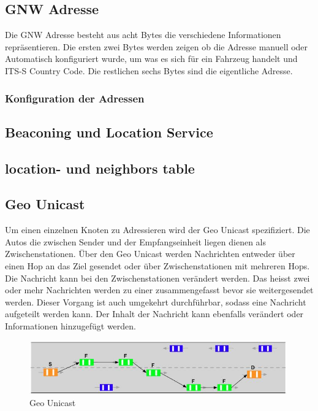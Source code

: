 \subsection{\acl{GNW} Adresse}
Die \acl{GNW} Adresse besteht aus acht Bytes die verschiedene Informationen repräsentieren. Die ersten zwei Bytes werden zeigen ob die Adresse manuell oder Automatisch konfiguriert wurde, um was es sich für ein Fahrzeug handelt und ITS-S Country Code. Die restlichen sechs Bytes sind die eigentliche Adresse.
\subsubsection{Konfiguration der Adressen}
\subsection{Beaconing und Location Service}

\subsection{location- und neighbors table}


\subsection{Geo Unicast}
Um einen einzelnen Knoten zu Adressieren wird der Geo Unicast spezifiziert. Die Autos die zwischen Sender und der Empfangseinheit liegen dienen als Zwischenstationen. Über den Geo Unicast werden Nachrichten entweder über einen Hop an das Ziel gesendet oder über Zwischenstationen mit mehreren Hops. Die Nachricht kann bei den Zwischenstationen verändert werden. Das heisst zwei oder mehr Nachrichten werden zu einer zusammengefasst bevor sie weitergesendet werden. Dieser Vorgang ist auch umgekehrt durchführbar, sodass eine Nachricht aufgeteilt werden kann. Der Inhalt der Nachricht kann ebenfalls verändert oder Informationen hinzugefügt werden. 

\begin{figure}
\includegraphics[width=0.99\textwidth]{content/images/03_networklayer/GeoUnicast.jpg}
\caption{Geo Unicast \cite{etsi102636-1}}
\label{fig:geounicast}
\end{figure}

